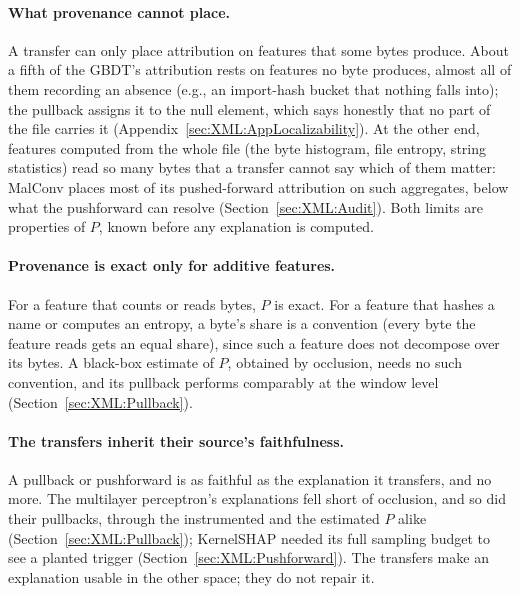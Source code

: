 \paragraph{What provenance cannot place.} A transfer can only place attribution on features that some bytes produce.
About a fifth of the GBDT's attribution rests on features no byte produces, almost all of them recording an absence
(e.g., an import-hash bucket that nothing falls into); the pullback assigns it to the null element, which says
honestly that no part of the file carries it (Appendix~\ref{sec:XML:AppLocalizability}). At the other end, features
computed from the whole file (the byte histogram, file entropy, string statistics) read so many bytes that a transfer
cannot say which of them matter: MalConv places most of its pushed-forward attribution on such aggregates, below what
the pushforward can resolve (Section~\ref{sec:XML:Audit}). Both limits are properties of $P$, known before any
explanation is computed.

\paragraph{Provenance is exact only for additive features.} For a feature that counts or reads bytes, $P$ is exact.
For a feature that hashes a name or computes an entropy, a byte's share is a convention (every byte the feature reads gets an
equal share), since such a feature does not decompose over its bytes. A black-box estimate of $P$, obtained by occlusion, needs no such
convention, and its pullback performs comparably at the window level (Section~\ref{sec:XML:Pullback}).

\paragraph{The transfers inherit their source's faithfulness.} A pullback or pushforward is as faithful as the
explanation it transfers, and no more. The multilayer perceptron's explanations fell short of occlusion, and so did
their pullbacks, through the instrumented and the estimated $P$ alike (Section~\ref{sec:XML:Pullback}); KernelSHAP
needed its full sampling budget to see a planted trigger (Section~\ref{sec:XML:Pushforward}). The transfers make an
explanation usable in the other space; they do not repair it.


